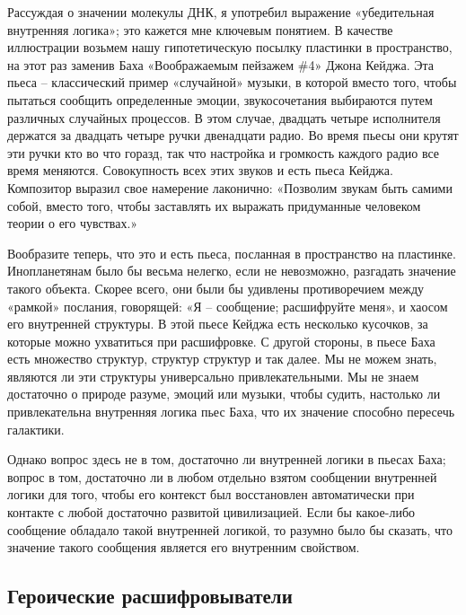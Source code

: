 \documentclass[../main.tex]{subfiles}
\begin{document}
Рассуждая о значении молекулы ДНК, я употребил выражение «убедительная внутренняя логика»; это кажется мне ключевым понятием. В качестве иллюстрации возьмем нашу гипотетическую посылку пластинки в пространство, на этот раз заменив Баха «Воображаемым пейзажем \#4» Джона Кейджа. Эта пьеса \--- классический пример «случайной» музыки, в которой вместо того, чтобы пытаться сообщить определенные эмоции, звукосочетания выбираются путем различных случайных процессов. В этом случае, двадцать четыре исполнителя держатся за двадцать четыре ручки двенадцати радио. Во время пьесы они крутят эти ручки кто во что горазд, так что настройка и громкость каждого радио все время меняются. Совокупность всех этих звуков и есть пьеса Кейджа. Композитор выразил свое намерение лаконично: «Позволим звукам быть самими собой, вместо того, чтобы заставлять их выражать придуманные человеком теории о его чувствах.»

Вообразите теперь, что это и есть пьеса, посланная в пространство на пластинке. Инопланетянам было бы весьма нелегко, если не невозможно, разгадать значение такого объекта. Скорее всего, они были бы удивлены противоречием между «рамкой» послания, говорящей: «Я \--- сообщение; расшифруйте меня», и хаосом его внутренней структуры. В этой пьесе Кейджа есть несколько кусочков, за которые можно ухватиться при расшифровке. С другой стороны, в пьесе Баха есть множество структур, структур структур и так далее. Мы не можем знать, являются ли эти структуры универсально привлекательными. Мы не знаем достаточно о природе разуме, эмоций или музыки, чтобы судить, настолько ли привлекательна внутренняя логика пьес Баха, что их значение способно пересечь галактики.

Однако вопрос здесь не в том, достаточно ли внутренней логики в пьесах Баха; вопрос в том, достаточно ли в любом отдельно взятом сообщении внутренней логики для того, чтобы его контекст был восстановлен автоматически при контакте с любой достаточно развитой цивилизацией. Если бы какое-либо сообщение обладало такой внутренней логикой, то разумно было бы сказать, что значение такого сообщения является его внутренним свойством.


\subsection{Героические расшифровыватели}
\end{document}
